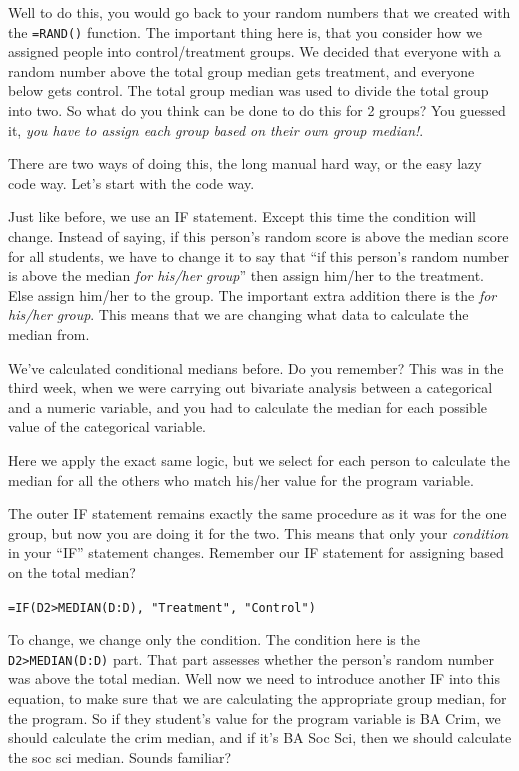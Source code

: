 \documentclass[]{book}
\theoremstyle{definition}
\theoremstyle{definition}
\theoremstyle{definition}
\theoremstyle{remark}
\begin{document}
Well to do this, you would go back to your random numbers that we
created with the \texttt{=RAND()} function. The important thing here is,
that you consider how we assigned people into control/treatment groups.
We decided that everyone with a random number above the total group
median gets treatment, and everyone below gets control. The total group
median was used to divide the total group into two. So what do you think
can be done to do this for 2 groups? You guessed it, \emph{you have to
assign each group based on their own group median!}.

There are two ways of doing this, the long manual hard way, or the easy
lazy code way. Let's start with the code way.

Just like before, we use an IF statement. Except this time the condition
will change. Instead of saying, if this person's random score is above
the median score for all students, we have to change it to say that ``if
this person's random number is above the median \emph{for his/her
group}'' then assign him/her to the treatment. Else assign him/her to
the group. The important extra addition there is the \emph{for his/her
group}. This means that we are changing what data to calculate the
median from.

We've calculated conditional medians before. Do you remember? This was
in the third week, when we were carrying out bivariate analysis between
a categorical and a numeric variable, and you had to calculate the
median for each possible value of the categorical variable.

Here we apply the exact same logic, but we select for each person to
calculate the median for all the others who match his/her value for the
program variable.

The outer IF statement remains exactly the same procedure as it was for
the one group, but now you are doing it for the two. This means that
only your \emph{condition} in your ``IF'' statement changes. Remember
our IF statement for assigning based on the total median?

\texttt{=IF(D2\textgreater{}MEDIAN(D:D),\ "Treatment",\ "Control")}

To change, we change only the condition. The condition here is the
\texttt{D2\textgreater{}MEDIAN(D:D)} part. That part assesses whether
the person's random number was above the total median. Well now we need
to introduce another IF into this equation, to make sure that we are
calculating the appropriate group median, for the program. So if they
student's value for the program variable is BA Crim, we should calculate
the crim median, and if it's BA Soc Sci, then we should calculate the
soc sci median. Sounds familiar?
\end{document}
